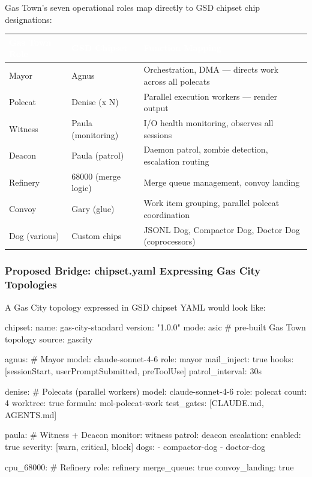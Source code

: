 \documentclass[11pt,letterpaper]{article}
\newcommand{\tableheader}[1]{\textbf{\sffamily\textcolor{white}{#1}}}
\begin{document}
Gas Town's seven operational roles map directly to GSD chipset chip designations:

\begin{center}
\begin{tabularx}{\textwidth}{L{3cm}L{3cm}X}
\toprule
{}
\tableheader{Gas Town Role} & \tableheader{GSD Chipset} & \tableheader{Function Mapping} \\
\midrule
Mayor & Agnus & Orchestration, DMA --- directs work across all polecats \\
Polecat & Denise (x N) & Parallel execution workers --- render output \\
Witness & Paula (monitoring) & I/O health monitoring, observes all sessions \\
Deacon & Paula (patrol) & Daemon patrol, zombie detection, escalation routing \\
Refinery & 68000 (merge logic) & Merge queue management, convoy landing \\
Convoy & Gary (glue) & Work item grouping, parallel polecat coordination \\
Dog (various) & Custom chips & JSONL Dog, Compactor Dog, Doctor Dog (coprocessors) \\
\bottomrule
\end{tabularx}
\end{center}

\subsubsection{Proposed Bridge: chipset.yaml Expressing Gas City Topologies}

A Gas City topology expressed in GSD chipset YAML would look like:

\begin{asciibox}
chipset:
  name: gas-city-standard
  version: "1.0.0"
  mode: asic         # pre-built Gas Town topology
  source: gascity

  agnus:             # Mayor
    model: claude-sonnet-4-6
    role: mayor
    mail_inject: true
    hooks: [sessionStart, userPromptSubmitted, preToolUse]
    patrol_interval: 30s

  denise:            # Polecats (parallel workers)
    model: claude-sonnet-4-6
    role: polecat
    count: 4
    worktree: true
    formula: mol-polecat-work
    test_gates: [CLAUDE.md, AGENTS.md]

  paula:             # Witness + Deacon
    monitor: witness
    patrol: deacon
    escalation:
      enabled: true
      severity: [warn, critical, block]
    dogs:
      - compactor-dog
      - doctor-dog

  cpu_68000:         # Refinery
    role: refinery
    merge_queue: true
    convoy_landing: true
\end{asciibox}
\end{document}
